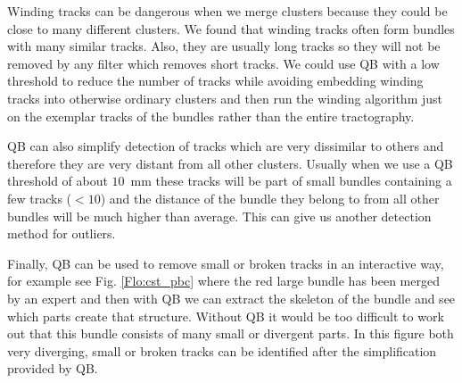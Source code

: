 \documentclass[preprint,authoryear,a4paper,10pt,onecolumn]{elsarticle}
\begin{document}
Winding tracks can be dangerous when we merge clusters because they
could be close to many different clusters. We found that winding tracks
often form bundles with many similar tracks. Also, they are usually long
tracks so they will not be removed by any filter which removes short
tracks. We could use QB with a low threshold to reduce the number of
tracks while avoiding embedding winding tracks into otherwise ordinary
clusters and then run the winding algorithm just on the exemplar tracks
of the bundles rather than the entire tractography.

QB can also simplify detection of tracks which are very dissimilar to
others and therefore they are very distant from all other clusters.
Usually when we use a QB threshold of about $10$~mm these tracks will be
part of small bundles containing a few tracks ($<10$) and the distance
of the bundle they belong to from all other bundles will be much higher
than average. This can give us another detection method for outliers.

Finally, QB can be used to remove small or broken tracks in an
interactive way, for example see Fig. \ref{Flo:cst_pbc} where the red
large bundle has been merged by an expert and then with QB we can
extract the skeleton of the bundle and see which parts create that
structure. Without QB it would be too difficult to work out that this
bundle consists of many small or divergent parts. In this figure both
very diverging, small or broken tracks can be identified after the
simplification provided by QB.
\end{document}
